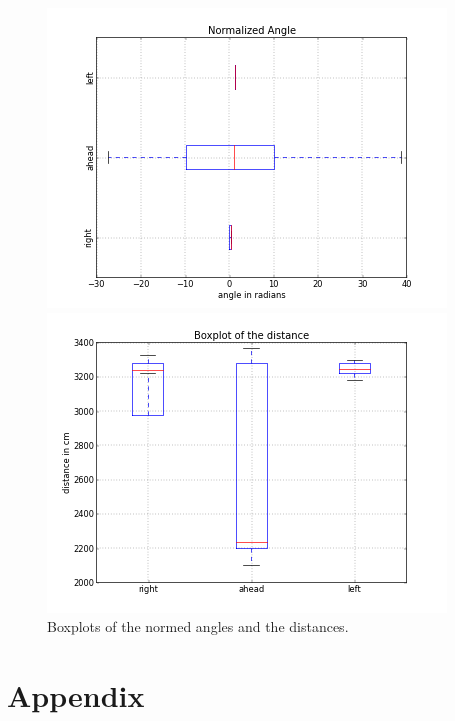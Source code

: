 \documentclass{scrartcl}
\begin{document}
\begin{figure}[H]
\centering
\begin{minipage}{.5\textwidth}
  \centering
  \includegraphics[width=.8\linewidth]{img/BoxplotAngleNorm_f.png}
\end{minipage}%
\begin{minipage}{.5\textwidth}
  \centering
  \includegraphics[width=.8\linewidth]{img/BoxplotDistance_f.png}
\end{minipage}
\caption{Boxplots of the normed angles and the distances.}
\label{fig:right}
\end{figure}





\section{Appendix}


\end{document}
